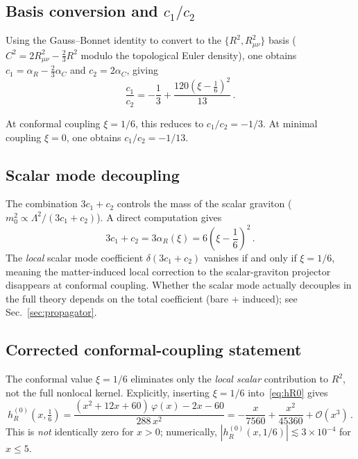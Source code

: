 \documentclass[aps,prd,twocolumn,superscriptaddress,nofootinbib,floatfix]{revtex4-2}
\theoremstyle{definition}
\theoremstyle{remark}
\begin{document}
\subsection{Basis conversion and \texorpdfstring{$c_1/c_2$}{c1/c2}}

Using the Gauss--Bonnet identity to convert to the $\{R^2, R_{\mu\nu}^2\}$
basis ($C^2 = 2R_{\mu\nu}^2 - \frac{2}{3}R^2$ modulo the topological Euler
density), one obtains $c_1 = \alpha_R - \frac{2}{3}\alpha_C$ and
$c_2 = 2\alpha_C$, giving
\begin{equation}
  \boxed{\frac{c_1}{c_2} = -\frac{1}{3}
    + \frac{120\!\left(\xi - \frac{1}{6}\right)^{\!2}}{13}\,.}
  \label{eq:c1c2}
\end{equation}

At conformal coupling $\xi = 1/6$, this reduces to $c_1/c_2 = -1/3$. At
minimal coupling $\xi = 0$, one obtains $c_1/c_2 = -1/13$.

\subsection{Scalar mode decoupling}

The combination $3c_1 + c_2$ controls the mass of the scalar graviton
($m_0^2 \propto \Lambda^2/(3c_1 + c_2)$). A direct computation gives
\begin{equation}
  3c_1 + c_2 = 3\alpha_R(\xi) = 6\!\left(\xi - \frac{1}{6}\right)^{\!2}\,.
  \label{eq:3c1c2}
\end{equation}
The \emph{local} scalar mode coefficient $\delta(3c_1 + c_2)$ vanishes if and
only if $\xi = 1/6$, meaning the matter-induced local correction to the
scalar-graviton projector disappears at conformal coupling. Whether the
scalar mode actually decouples in the full theory depends on the total
coefficient (bare + induced); see Sec.~\ref{sec:propagator}.

\subsection{Corrected conformal-coupling statement}

The conformal value $\xi = 1/6$ eliminates only the \emph{local scalar}
contribution to $R^2$, not the full nonlocal kernel. Explicitly, inserting
$\xi = 1/6$ into~\eqref{eq:hR0} gives
\begin{equation}
  h_R^{(0)}\!\left(x, \tfrac{1}{6}\right)
  = \frac{(x^2 + 12x + 60)\,\varphi(x) - 2x - 60}{288\,x^2}
  = -\frac{x}{7560} + \frac{x^2}{45360} + \mathcal{O}(x^3)\,.
  \label{eq:hR0-conformal}
\end{equation}
This is \emph{not} identically zero for $x > 0$; numerically,
$|h_R^{(0)}(x, 1/6)| \lesssim 3 \times 10^{-4}$ for $x \leq 5$.
\end{document}
